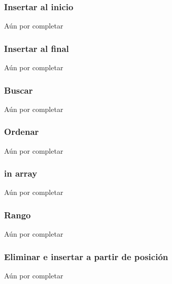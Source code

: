 \subsubsection{Insertar al inicio}
Aún por completar

\subsubsection{Insertar al final}
Aún por completar

\subsubsection{Buscar}
Aún por completar

\subsubsection{Ordenar}
Aún por completar

\subsubsection{in array}
Aún por completar

\subsubsection{Rango}
Aún por completar

\subsubsection{Eliminar e insertar a partir de posición}
Aún por completar
